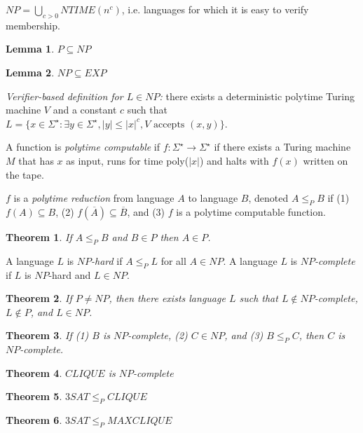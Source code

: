 \documentclass[letterpaper,landscape,11pt]{article}
\newtheorem{theorem}{Theorem}
\newtheorem{lemma}{Lemma}
\begin{document}
$NP = \bigcup_{c > 0} NTIME(n^c)$, i.e. languages for which it is easy to verify membership.

\begin{lemma}
	$P \subseteq NP$
\end{lemma}

\begin{lemma}
	$NP \subseteq EXP$
\end{lemma}

\emph{Verifier-based definition for $L \in NP$:} there exists a deterministic polytime Turing machine $V$ and a constant $c$ such that $L = \{x \in \Sigma^\star : \exists y \in \Sigma^\star, |y| \leq |x|^c, V \text{ accepts } (x, y)\}$.

A function is \emph{polytime computable} if $f : \Sigma^\star \rightarrow \Sigma^\star$ if there exists a Turing machine $M$ that has $x$ as input, runs for time poly($|x|$) and halts with $f(x)$ written on the tape.

$f$ is a \emph{polytime reduction} from language $A$ to language $B$, denoted $A \leq_P B$ if (1) $f(A) \subseteq B$, (2) $f(\overline{A}) \subseteq \overline{B}$, and (3) $f$ is a polytime computable function.

\begin{theorem}
	If $A \leq_P B$ and $B \in P$ then $A \in P$.
\end{theorem}

A language $L$ is \emph{$NP$-hard} if $A \leq_P L$ for all $A \in NP$. A language $L$ is \emph{$NP$-complete} if $L$ is $NP$-hard and $L \in NP$.

\begin{theorem}
	If $P \neq NP$, then there exists language $L$ such that $L \notin NP$-complete, $L \notin P$, and $L \in NP$.
\end{theorem}

\begin{theorem}
	If (1) $B$ is $NP$-complete, (2) $C \in NP$, and (3) $B \leq_P C$, then $C$ is $NP$-complete.
\end{theorem}

\begin{theorem}
	$CLIQUE$ is $NP$-complete
\end{theorem}

\begin{theorem}
	$3SAT \leq_P CLIQUE$
\end{theorem}

\begin{theorem}
	$3SAT \leq_P MAXCLIQUE$
\end{theorem}
\end{document}
